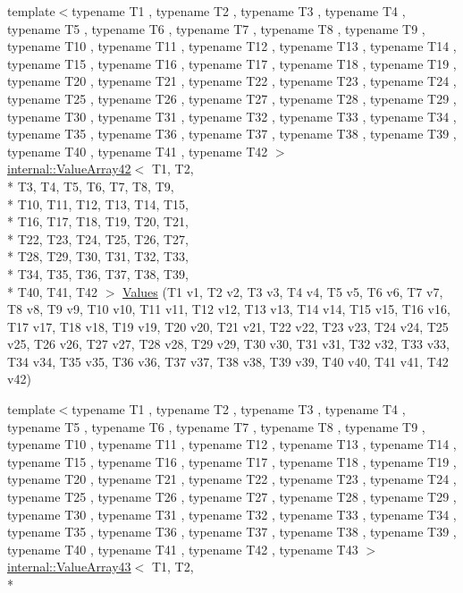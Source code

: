 \begin{DoxyCompactItemize}
\item 
{\footnotesize template$<$typename T1 , typename T2 , typename T3 , typename T4 , typename T5 , typename T6 , typename T7 , typename T8 , typename T9 , typename T10 , typename T11 , typename T12 , typename T13 , typename T14 , typename T15 , typename T16 , typename T17 , typename T18 , typename T19 , typename T20 , typename T21 , typename T22 , typename T23 , typename T24 , typename T25 , typename T26 , typename T27 , typename T28 , typename T29 , typename T30 , typename T31 , typename T32 , typename T33 , typename T34 , typename T35 , typename T36 , typename T37 , typename T38 , typename T39 , typename T40 , typename T41 , typename T42 $>$ }\\\hyperlink{classtesting_1_1internal_1_1_value_array42}{internal\-::\-Value\-Array42}$<$ T1, T2, \\*
T3, T4, T5, T6, T7, T8, T9, \\*
T10, T11, T12, T13, T14, T15, \\*
T16, T17, T18, T19, T20, T21, \\*
T22, T23, T24, T25, T26, T27, \\*
T28, T29, T30, T31, T32, T33, \\*
T34, T35, T36, T37, T38, T39, \\*
T40, T41, T42 $>$ \hyperlink{namespacetesting_a0951fc3989cde27914791eb120f8f01c}{Values} (T1 v1, T2 v2, T3 v3, T4 v4, T5 v5, T6 v6, T7 v7, T8 v8, T9 v9, T10 v10, T11 v11, T12 v12, T13 v13, T14 v14, T15 v15, T16 v16, T17 v17, T18 v18, T19 v19, T20 v20, T21 v21, T22 v22, T23 v23, T24 v24, T25 v25, T26 v26, T27 v27, T28 v28, T29 v29, T30 v30, T31 v31, T32 v32, T33 v33, T34 v34, T35 v35, T36 v36, T37 v37, T38 v38, T39 v39, T40 v40, T41 v41, T42 v42)
\item 
{\footnotesize template$<$typename T1 , typename T2 , typename T3 , typename T4 , typename T5 , typename T6 , typename T7 , typename T8 , typename T9 , typename T10 , typename T11 , typename T12 , typename T13 , typename T14 , typename T15 , typename T16 , typename T17 , typename T18 , typename T19 , typename T20 , typename T21 , typename T22 , typename T23 , typename T24 , typename T25 , typename T26 , typename T27 , typename T28 , typename T29 , typename T30 , typename T31 , typename T32 , typename T33 , typename T34 , typename T35 , typename T36 , typename T37 , typename T38 , typename T39 , typename T40 , typename T41 , typename T42 , typename T43 $>$ }\\\hyperlink{classtesting_1_1internal_1_1_value_array43}{internal\-::\-Value\-Array43}$<$ T1, T2, \\*

\end{DoxyCompactItemize}
